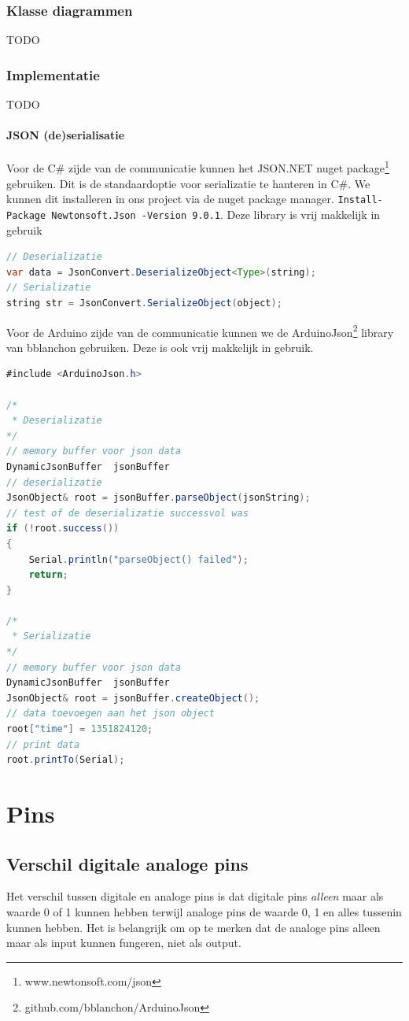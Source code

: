 \documentclass[10pt,twoside]{report}
\newcommand{\code}[1]{{\texttt{#1}}}
\newcommand{\lbr}{\hfill\break}
\begin{document}
\subsubsection{Klasse diagrammen}
TODO
\subsubsection{Implementatie}
TODO
\paragraph{JSON (de)serialisatie}
Voor de C\# zijde van de communicatie kunnen het JSON.NET nuget package\footnote{www.newtonsoft.com/json} gebruiken. Dit is de standaardoptie voor serializatie te hanteren in C\#. We kunnen dit installeren in ons project via de nuget package manager. \code{Install-Package Newtonsoft.Json -Version 9.0.1}. Deze library is vrij makkelijk in gebruik\lbr
\begin{lstlisting}[language=java]
// Deserializatie
var data = JsonConvert.DeserializeObject<Type>(string);
// Serializatie
string str = JsonConvert.SerializeObject(object);
\end{lstlisting}
Voor de Arduino zijde van de communicatie kunnen we de ArduinoJson\footnote{github.com/bblanchon/ArduinoJson} library van bblanchon gebruiken. Deze is ook vrij makkelijk in gebruik.\lbr
\begin{lstlisting}[language=java]
#include <ArduinoJson.h>

/*
 * Deserializatie
*/
// memory buffer voor json data
DynamicJsonBuffer  jsonBuffer
// deserializatie
JsonObject& root = jsonBuffer.parseObject(jsonString);
// test of de deserializatie successvol was
if (!root.success())
{
    Serial.println("parseObject() failed");
    return;
}

/*
 * Serializatie
*/
// memory buffer voor json data
DynamicJsonBuffer  jsonBuffer
JsonObject& root = jsonBuffer.createObject();
// data toevoegen aan het json object
root["time"] = 1351824120;
// print data
root.printTo(Serial);
\end{lstlisting}

\section{Pins}
\subsection{Verschil digitale analoge pins}
Het verschil tussen digitale en analoge pins is dat digitale pins \textit{alleen} maar als waarde 0 of 1 kunnen hebben terwijl analoge pins de waarde 0, 1 en alles tussenin kunnen hebben. Het is belangrijk om op te merken dat de analoge pins alleen maar als input kunnen fungeren, niet als output.
\end{document}
